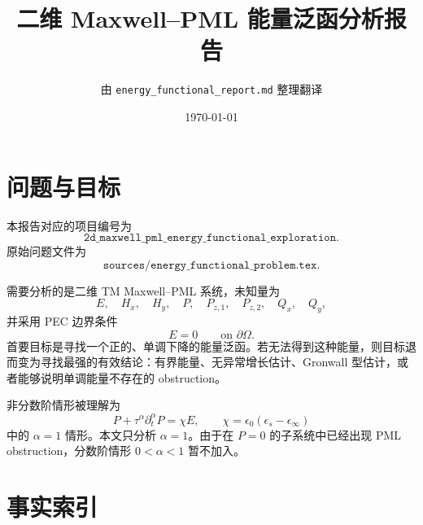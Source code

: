\documentclass[UTF8,a4paper,12pt]{ctexart}
\title{二维 Maxwell--PML 能量泛函分析报告}
\author{由 \texttt{energy\_functional\_report.md} 整理翻译}
\date{\today}
\begin{document}
\maketitle

\section{问题与目标}

本报告对应的项目编号为
\[
\texttt{2d\_maxwell\_pml\_energy\_functional\_exploration}.
\]
原始问题文件为
\[
\texttt{sources/energy\_functional\_problem.tex}.
\]

需要分析的是二维 TM Maxwell--PML 系统，未知量为
\[
E,\quad H_x,\quad H_y,\quad P,\quad P_{z,1},\quad P_{z,2},\quad Q_x,\quad Q_y,
\]
并采用 PEC 边界条件
\[
E=0\qquad \text{on }\partial\Omega .
\]
首要目标是寻找一个正的、单调下降的能量泛函。若无法得到这种能量，则目标退而变为寻找最强的有效结论：有界能量、无异常增长估计、Gronwall 型估计，或者能够说明单调能量不存在的 obstruction。

非分数阶情形被理解为
\[
P+\tau^\alpha\partial_t^\alpha P=\chi E,\qquad
\chi=\epsilon_0(\epsilon_s-\epsilon_\infty)
\]
中的 \(\alpha=1\) 情形。本文只分析 \(\alpha=1\)。由于在 \(P=0\) 的子系统中已经出现 PML obstruction，分数阶情形 \(0<\alpha<1\) 暂不加入。

\section{事实索引}
\end{document}

